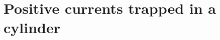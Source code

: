 \documentclass[12pt]{amsbook}%
\newtheorem{lem}[thm]{Lemma}
\theoremstyle{definition}
\theoremstyle{remark}
\numberwithin{section}{chapter}
\numberwithin{subsection}{section}
\numberwithin{figure}{chapter}
\DeclareMathOperator{\C}{\mathbb{C}}
\begin{document}
{{\medskip
%  
%  

\section{Positive currents trapped in a cylinder}\label{sec:Positive currents trapped in a cylinder}


}}
\end{document}
